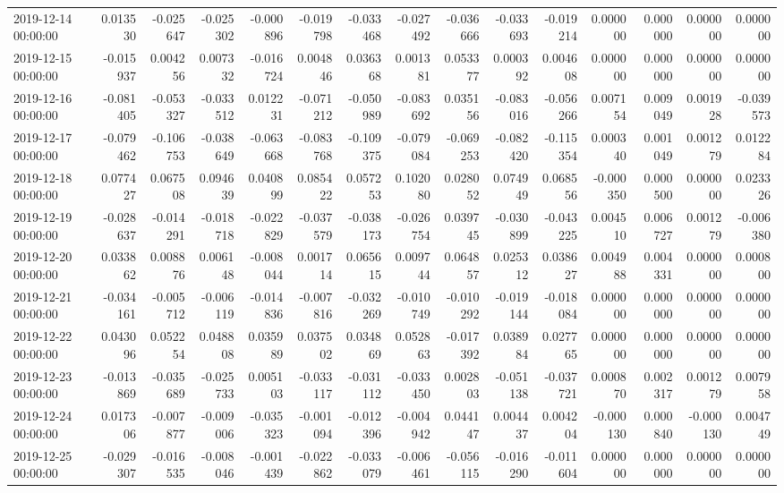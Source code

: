 \begin{tabular}{lrrrrrrrrrrrrrr}
2019-12-14 00:00:00 & 0.013530 & -0.025647 & -0.025302 & -0.000896 & -0.019798 & -0.033468 & -0.027492 & -0.036666 & -0.033693 & -0.019214 & 0.000000 & 0.000000 & 0.000000 & 0.000000 \\
2019-12-15 00:00:00 & -0.015937 & 0.004256 & 0.007332 & -0.016724 & 0.004846 & 0.036368 & 0.001381 & 0.053377 & 0.000392 & 0.004608 & 0.000000 & 0.000000 & 0.000000 & 0.000000 \\
2019-12-16 00:00:00 & -0.081405 & -0.053327 & -0.033512 & 0.012231 & -0.071212 & -0.050989 & -0.083692 & 0.035156 & -0.083016 & -0.056266 & 0.007154 & 0.009049 & 0.001928 & -0.039573 \\
2019-12-17 00:00:00 & -0.079462 & -0.106753 & -0.038649 & -0.063668 & -0.083768 & -0.109375 & -0.079084 & -0.069253 & -0.082420 & -0.115354 & 0.000340 & 0.001049 & 0.001279 & 0.012284 \\
2019-12-18 00:00:00 & 0.077427 & 0.067508 & 0.094639 & 0.040899 & 0.085422 & 0.057253 & 0.102080 & 0.028052 & 0.074949 & 0.068556 & -0.000350 & 0.000500 & 0.000000 & 0.023326 \\
2019-12-19 00:00:00 & -0.028637 & -0.014291 & -0.018718 & -0.022829 & -0.037579 & -0.038173 & -0.026754 & 0.039745 & -0.030899 & -0.043225 & 0.004510 & 0.006727 & 0.001279 & -0.006380 \\
2019-12-20 00:00:00 & 0.033862 & 0.008876 & 0.006148 & -0.008044 & 0.001714 & 0.065615 & 0.009744 & 0.064857 & 0.025312 & 0.038627 & 0.004988 & 0.004331 & 0.000000 & 0.000800 \\
2019-12-21 00:00:00 & -0.034161 & -0.005712 & -0.006119 & -0.014836 & -0.007816 & -0.032269 & -0.010749 & -0.010292 & -0.019144 & -0.018084 & 0.000000 & 0.000000 & 0.000000 & 0.000000 \\
2019-12-22 00:00:00 & 0.043096 & 0.052254 & 0.048808 & 0.035989 & 0.037502 & 0.034869 & 0.052863 & -0.017392 & 0.038984 & 0.027765 & 0.000000 & 0.000000 & 0.000000 & 0.000000 \\
2019-12-23 00:00:00 & -0.013869 & -0.035689 & -0.025733 & 0.005103 & -0.033117 & -0.031112 & -0.033450 & 0.002803 & -0.051138 & -0.037721 & 0.000870 & 0.002317 & 0.001279 & 0.007958 \\
2019-12-24 00:00:00 & 0.017306 & -0.007877 & -0.009006 & -0.035323 & -0.001094 & -0.012396 & -0.004942 & 0.044147 & 0.004437 & 0.004204 & -0.000130 & 0.000840 & -0.000130 & 0.004749 \\
2019-12-25 00:00:00 & -0.029307 & -0.016535 & -0.008046 & -0.001439 & -0.022862 & -0.033079 & -0.006461 & -0.056115 & -0.016290 & -0.011604 & 0.000000 & 0.000000 & 0.000000 & 0.000000 \\

\end{tabular}
